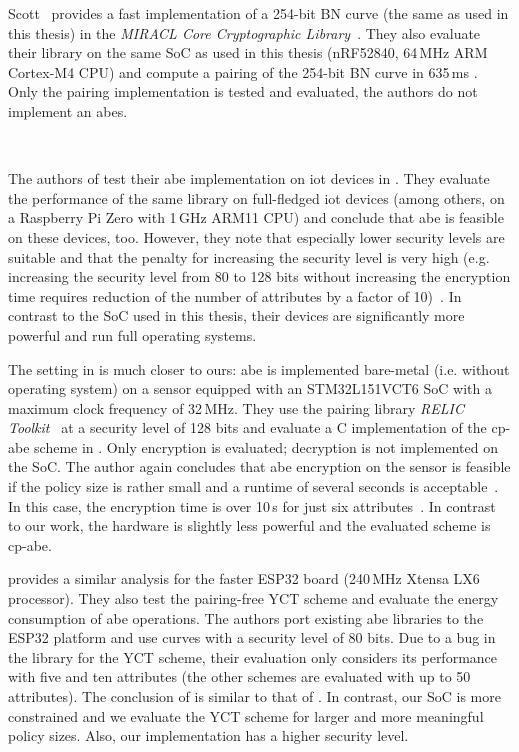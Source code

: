 Scott~\cite{scott_deployment_2020} provides a fast implementation of a 254-bit BN curve (the same as used in this thesis) in the \emph{MIRACL Core Cryptographic Library}~\cite{scott_miracl_nodate}.
They also evaluate their library on the same SoC as used in this thesis (nRF52840, 64\,MHz ARM Cortex-M4 CPU) and compute a pairing of the 254-bit BN curve in 635\,ms \cite[Table~4]{scott_deployment_2020}.
Only the pairing implementation is tested and evaluated, the authors do not implement an \acrshort{abes}.

~

The authors of \cite{ambrosin_feasibility_2015} test their \acrshort{abe} implementation on \gls{iot} devices in \cite{ambrosin_feasibility_2016}.
They evaluate the performance of the same library on full-fledged \acrshort{iot} devices (among others, on a Raspberry Pi Zero with 1\,GHz ARM11 CPU) and conclude that \acrshort{abe} is feasible on these devices, too.
However, they note that especially lower security levels are suitable and that the penalty for increasing the security level is very high (e.g. increasing the security level from 80 to 128 bits without increasing the encryption time requires reduction of the number of attributes by a factor of 10)~\cite{ambrosin_feasibility_2016}.
In contrast to the SoC used in this thesis, their devices are significantly more powerful and run full operating systems.

The setting in \cite{borgh_attribute-based_2016} is much closer to ours: \acrshort{abe} is implemented bare-metal (i.e. without operating system) on a sensor equipped with an STM32L151VCT6 SoC with a maximum clock frequency of 32\,MHz.
They use the pairing library \emph{RELIC Toolkit}~\cite{aranha_relic_nodate} at a security level of 128 bits and evaluate a C implementation of the \acrshort{cp-abe} scheme in \cite{waters_ciphertext-policy_2011}.
Only encryption is evaluated; decryption is not implemented on the SoC.
The author again concludes that \acrshort{abe} encryption on the sensor is feasible if the policy size is rather small and a runtime of several seconds is acceptable~\cite{borgh_attribute-based_2016}.
In this case, the encryption time is over 10\,s for just six attributes~\cite{borgh_attribute-based_2016}.
In contrast to our work, the hardware is slightly less powerful and the evaluated scheme is \acrshort{cp-abe}.

\cite{girgenti_feasibility_2019} provides a similar analysis for the faster ESP32 board (240\,MHz Xtensa LX6 processor).
They also test the pairing-free YCT scheme \cite{yao_lightweight_2015} and evaluate the energy consumption of \acrshort{abe} operations.
The authors port existing \acrshort{abe} libraries to the ESP32 platform and use curves with a security level of 80 bits.
Due to a bug in the library for the YCT scheme, their evaluation only considers its performance with five and ten attributes (the other schemes are evaluated with up to 50 attributes).
The conclusion of \cite{girgenti_feasibility_2019} is similar to that of \cite{borgh_attribute-based_2016}. 
In contrast, our SoC is more constrained and we evaluate the YCT scheme for larger and more meaningful policy sizes.
Also, our implementation has a higher security level.